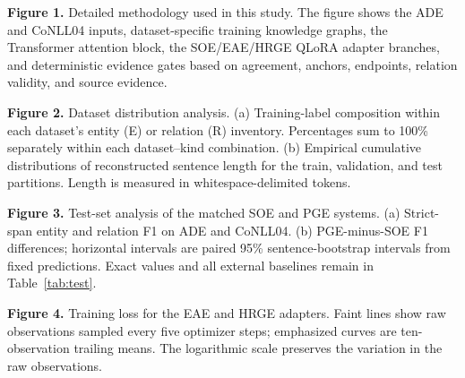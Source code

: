 \noindent\textbf{Figure 1.} Detailed methodology used in this study. The figure shows the ADE and
CoNLL04 inputs, dataset-specific training knowledge graphs, the Transformer
attention block, the SOE/EAE/HRGE QLoRA adapter branches, and deterministic
evidence gates based on agreement, anchors, endpoints, relation validity, and
source evidence.\par

\noindent\textbf{Figure 2.} Dataset distribution analysis. (a) Training-label composition within
each dataset's entity (E) or relation (R) inventory. Percentages sum to 100\%
separately within each dataset--kind combination. (b) Empirical cumulative
distributions of reconstructed sentence length for the train, validation, and
test partitions. Length is measured in whitespace-delimited tokens.\par

\noindent\textbf{Figure 3.} Test-set analysis of the matched SOE and PGE systems. (a) Strict-span
entity and relation F1 on ADE and CoNLL04. (b) PGE-minus-SOE F1 differences;
horizontal intervals are paired 95\% sentence-bootstrap intervals from fixed
predictions. Exact values and all external baselines remain in
Table~\ref{tab:test}.\par

\noindent\textbf{Figure 4.} Training loss for the EAE and HRGE adapters. Faint lines show raw
observations sampled every five optimizer steps; emphasized curves are
ten-observation trailing means. The logarithmic scale preserves the variation
in the raw observations.\par
